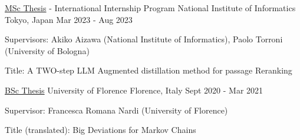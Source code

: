 

\begin{cventries}

  \cventry
    {\href{https://amslaurea.unibo.it/30082/}{MSc Thesis} - International Internship Program} %
    {National Institute of Informatics} %
    {Tokyo, Japan} %
    {Mar 2023 - Aug 2023} %
    {
      \begin{cvitems} %
        \item {Supervisors: Akiko Aizawa (National Institute of Informatics), Paolo Torroni (University of Bologna)} 
        \item {Title: A TWO-step LLM Augmented distillation method for passage Reranking}
      \end{cvitems}
    }

  \cventry
    {\href{https://github.com/Freddavide/Freddavide/blob/main/elaborato_B036_Baldelli_Davide.pdf}{BSc Thesis}} %
    {University of Florence} %
    {Florence, Italy} %
    {Sept 2020 - Mar 2021} %
    {
      \begin{cvitems} %
        \item {Supervisor: Francesca Romana Nardi (University of Florence)}
        \item {Title (translated): Big Deviations for Markov Chains}
      \end{cvitems}
    }



\end{cventries}
